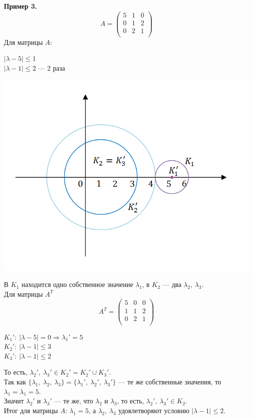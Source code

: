 \textbf{Пример 3.}\\
\[A=\begin{pmatrix}
5 & 1 & 0 \\
0 & 1 & 2 \\
0 & 2 & 1 \\
\end{pmatrix}\]
Для матрицы $A$:
\begin{center}
    $|\lambda-5|\leqslant 1$\\
    $|\lambda-1|\leqslant 2$ --- 2 раза
\end{center}
\begin{center}
    \includegraphics[scale=0.8]{l9_6.png}
\end{center}
В $K_1$ находится одно собственное значение $\lambda_1$, в $K_2$ --- два $\lambda_2,~\lambda_3$.\\
Для матрицы $A^T$
\[A^T=\begin{pmatrix}
5 & 0 & 0 \\
1 & 1 & 2 \\
0 & 2 & 1 \\
\end{pmatrix}\]
\begin{center}
    $K_1':~|\lambda-5|=0 \Rightarrow \lambda_1'=5$\\
    $K_2':~|\lambda-1|\leqslant 3$\\
    $K_3':~|\lambda-1|\leqslant 2$
\end{center}
То есть, $\lambda_2',~\lambda_3'\in K_2'=K_2'\cup K_3'$.\\
Так как $\{\lambda_1,~\lambda_2,~\lambda_3\}=\{\lambda_1',~\lambda_2',~\lambda_3'\}$ --- те же собственные значения, то $\lambda_1=\lambda_1=5$.\\
Значит $\lambda_2'$ и $\lambda_3'$ --- те же, что $\lambda_2$ и $\lambda_3$, то есть, $\lambda_2',~\lambda_3'\in K_2$.\\
Итог для матрицы $A$: $\lambda_1=5$, а $\lambda_2,~\lambda_3$ удовлетворяют условию $|\lambda-1|\leqslant 2$.
